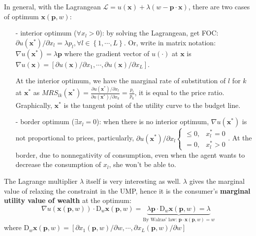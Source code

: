In general, with the Lagrangean $\mathcal{L}=u(\mathbf{x})+\lambda (w-\mathbf{p}\cdot\mathbf{x})$, there are two cases of optimum $\mathbf{x}(\mathbf{p},w)$:
\begin{enumerate}
    \item[-] interior optimum ($\forall x_l>0$): by solving the Lagrangean, get FOC: $\partial u(\mathbf{x}^*)/\partial x_l= \lambda p_l,\forall l\in \left\{1,\cdots,L\right\}$. Or, write in matrix notation: $\nabla u(\mathbf{x}^*)=\lambda \mathbf{p}$ where the gradient vector of $u(\cdot)$ at $\mathbf{x}$ is $\nabla u(\mathbf{x})=\left[\partial u(\mathbf{x})/\partial x_1,\cdots, \partial u(\mathbf{x})/\partial x_L\right]$.
    
    At the interior optimum, we have the marginal rate of substitution of $l$ for $k$ at $\mathbf{x}^*$ as $MRS_{lk}(\mathbf{x}^*)=\frac{\partial u(\mathbf{x}^*)/\partial x_l}{\partial u(\mathbf{x}^*)/\partial x_k}=\frac{p_l}{p_k}$, it is equal to the price ratio. Graphically, $\mathbf{x}^*$ is the tangent point of the utility curve to the budget line.
    \item[-] border optimum ($\exists x_l=0$): when there is no interior optimum, $\nabla u(\mathbf{x}^*)$ is not proportional to prices, particularly, $\partial u(\mathbf{x}^*)/\partial x_l\begin{cases}\leq 0, & x^*_l=0 \\ =0 , & x^*_l>0\end{cases}$. At the border, due to nonnegativity of consumption, even when the agent wants to decrease the consumption of $x_l$, she won't be able to.
\end{enumerate}

The Lagrange multiplier $\lambda$ itself is very interesting as well. $\lambda$ gives the marginal value of relaxing the constraint in the UMP, hence it is the consumer's \textbf{marginal utility value of wealth} at the optimum: $$\nabla u(\textbf{x}(\textbf{p},w))\cdot \mathrm{D}_w\mathbf{x}(\mathbf{p},w)=\underbrace{\lambda \mathbf{p}\cdot \mathrm{D}_w\mathbf{x}(\mathbf{p},w)=\lambda}_{\text{By Walras' law: }\mathbf{p}\cdot\mathbf{x}(\mathbf{p},w)=w}$$ where $\mathrm{D}_w\mathbf{x}(\mathbf{p},w)=\left[\partial x_1(\mathbf{p},w)/\partial w,\cdots, \partial x_L(\mathbf{p},w)/\partial w\right]$

